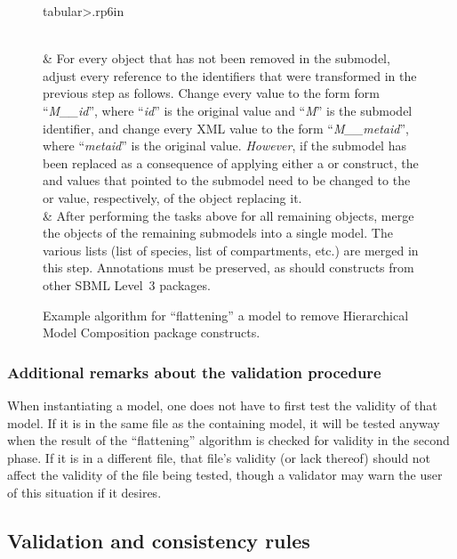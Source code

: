 \begin{figure}[thb]
\begin{edtable}{tabular}{>{\therownum.}rp{6in}}
\begin{enumerate}[label={\alph*})]
    \vspace*{-1em}
    \end{enumerate}
    \\
    & For every object that has not been removed in the submodel,
    adjust every reference to the identifiers that were transformed in
    the previous step as follows.  Change every  value
    to the form form ``\emph{M\_\_id}'', where ``\emph{id}'' is the
    original  value and ``\emph{M}'' is the submodel
    identifier, and change every XML  value to the form
    ``\emph{M\_\_metaid}'', where ``\emph{metaid}'' is the original
     value.  \emph{However}, if the submodel has been
    replaced as a consequence of applying either a \ReplacedElement or
    \ReplacedBy construct, the  and 
    values that pointed to the submodel need to be changed to the
     or  value, respectively, of the object
    replacing it.
    \\
    & After performing the tasks above for all remaining objects,
    merge the objects of the remaining submodels into a single model.
    The various lists (list of species, list of compartments, etc.) are
    merged in this step.  Annotations must be preserved, as should
    constructs from other SBML Level~3 packages.
    \\
    \bottomrule
  \end{edtable}
  \caption{Example algorithm for ``flattening'' a model to remove
    Hierarchical Model Composition package constructs.}
  \label{flattening-algo}
\end{figure}


\subsubsection{Additional remarks about the validation procedure}

When \notice instantiating a model, one does not have to first test the
validity of that model.  If it is in the same file as the containing
model, it will be tested anyway when the result of the ``flattening''
algorithm is checked for validity in the second phase.  If it is in a
different file, that file's validity (or lack thereof) should not affect
the validity of the file being tested, though a validator may warn the
user of this situation if it desires.


\subsection{Validation and consistency rules}
\label{validation-rules}

